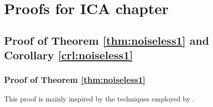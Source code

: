 
\chapter{Proofs for ICA chapter}

\section{Proof of Theorem \ref{thm:noiseless1} and Corollary \ref{crl:noiseless1}}
\label{appendix:thm_noiseless}

\subsection{Proof of Theorem \ref{thm:noiseless1}}\label{appendix:proof-thm1}
This proof is mainly inspired by the techniques employed by \cite{hyvarinen19a}.

